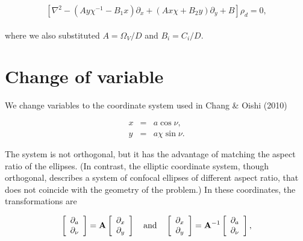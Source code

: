 \documentclass[apj]{emulateapj}
\newcommand{\pderiv}[2]{\frac{\partial #1}{\partial #2}}
\newcommand{\pderivn}[3]{\frac{\partial^{#3} #1}{\partial #2^{#3}}}
\newcommand{\vt}[1]{\mathbf{#1}}       %
\renewcommand{\v}[1]{{\boldsymbol{#1}}} %
\newcommand{\Laplace}{\nabla^2}
\newcommand{\beq}{\begin{equation}}
\newcommand{\eeq}{\end{equation}}
\newcommand{\beqn}{\begin{eqnarray}}
\newcommand{\eeqn}{\end{eqnarray}}
\begin{document}


\beq
\left[\Laplace{} - \left(Ay\chi^{-1} - B_1x\right) \partial_x  +
  \left(A x \chi + B_2y\right) \partial_y + B \right] \rho_d   = 0,  
\label{eq:dust-trapping-cartesian}
\eeq
\\
\noindent where we also substituted  $A=\varOmega_V/D$ and $B_i=C_i/D$.

\section{Change of variable}

We change variables to the coordinate system used in Chang \& Oishi (2010)

\beqn
  x &=& a \cos\nu, \label{eq:change-x}\\
  y &=& a\chi\sin\nu.  \label{eq:change-y}
\eeqn

The system is not orthogonal, but it has the advantage of matching the
aspect ratio of the ellipses. (In contrast, the elliptic coordinate
system, though orthogonal, describes a system of confocal ellipses of
different aspect ratio, that does not coincide with the geometry of
the problem.) In these coordinates, the transformations are 


\beq
\left[\begin{array}{c}
    \partial_{a}  \\
    \partial_{\nu}
  \end{array}\right] = \vt{A} 
  \left[\begin{array}{c}
      \partial_{x}  \\
      \partial_{y}
    \end{array}\right] 
%
\quad {\rm and} \quad 
%
\left[\begin{array}{c}
    \partial_{x}  \\
    \partial_{y}
  \end{array}\right] = \vt{A}^{-1} 
  \left[\begin{array}{c}
      \partial_{a}  \\
      \partial_{\nu}
    \end{array}\right],  
%
\eeq
\end{document}
